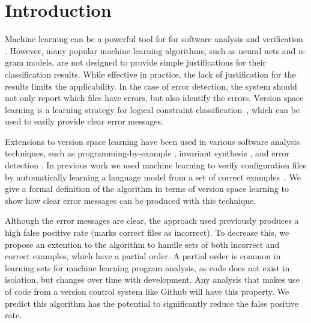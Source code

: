 \section{Introduction}

Machine learning can be a powerful tool for for software analysis and verification \cite{lau2000version,Santolucito2016,gehrpsi,garg2014ice}.
However, many popular machine learning algorithms, such as neural nets and n-gram models, are not designed to provide simple justifications for their classification results.
While effective in practice, the lack of justification for the results limits the applicability.
In the case of error detection, the system should not only report which files have errors, but also identify the errors.
Version space learning is a learning strategy for logical constraint classification~\cite{mitchell82}, which can be used to easily provide clear error messages.


Extensions to version space learning have been used in various software analysis techniques, such as programming-by-example \cite{lau2000version}, invariant synthesis \cite{garg2014ice}, and error detection \cite{Santolucito2016}.
In previous work we used machine learning to verify configuration files by automatically learning a language model from a set of correct examples~\cite{Santolucito2016}.
We give a formal definition of the algorithm in terms of version space learning to show how clear error messages can be produced with this technique.

Although the error messages are clear, the approach used previously produces a high false positive rate (marks correct files as incorrect).
To decrease this, we propose an extention to the algorithm to handle sets of both incorrect and correct examples, which have a partial order.
A partial order is common in learning sets for machine learning program analysis, as code does not exist in isolation, but changes over time with development.
Any analysis that makes use of code from a version control system like Github will have this property.
We predict this algorithm has the potential to significantly reduce the false positive rate.

